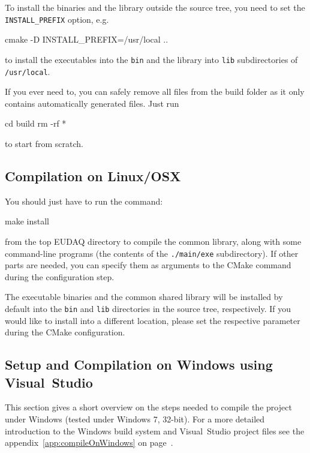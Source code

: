 To install the binaries and the library outside the source tree, you
need to set the \texttt{INSTALL\_PREFIX} option, e.g.
\begin{listing}[mybash]
cmake -D INSTALL_PREFIX=/usr/local ..
\end{listing}
to install the executables into the \texttt{bin} and the library into \texttt{lib} subdirectories of \texttt{/usr/local}.

If you ever need to, you can safely remove all files from the build folder
as it only contains automatically generated files. Just run
\begin{listing}[mybash]
cd build
rm -rf *
\end{listing}
to start from scratch.


\subsection{Compilation on Linux/OSX}
You should just have to run the command:
\begin{listing}[mybash]
make install
\end{listing}

from the top EUDAQ directory to compile the common library,
along with some command-line programs (the contents of the \texttt{./main/exe} subdirectory).
If other parts are needed, you can specify them as arguments to the
CMake command during the configuration step.

The executable binaries and the common shared library will be installed by default into the
\texttt{bin} and \texttt{lib} directories in the source tree,
respectively. If you would like to install into a different location,
please set the respective parameter during the CMake configuration.

\subsection{Setup and Compilation on Windows using Visual~Studio}

This section gives a short overview on the steps needed to compile the
project under Windows (tested under Windows 7, 32-bit). For a more
detailed introduction to the Windows build system and Visual~Studio
project files see the appendix~\ref{app:compileOnWindows} on
page~\pageref{app:compileOnWindows}.

